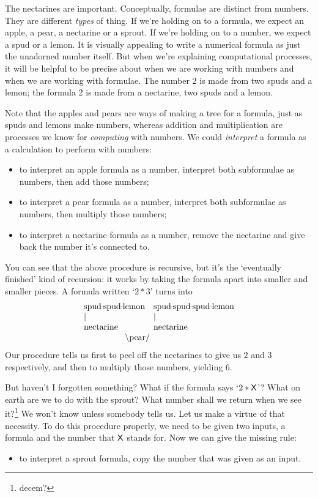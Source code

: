 \documentclass{book}
\begin{document}
The nectarines are important. Conceptually, formulae are distinct from numbers. They are different \emph{types} of thing. If we're holding on to a formula, we expect an apple, a pear, a nectarine or a sprout. If we're holding on to a number, we expect a spud or a lemon. It is visually appealing to write a numerical formula as just the unadorned number itself. But when we're explaining computational processes, it will be helpful to be precise about when we are working with numbers and when we are working with formulae. The number 2 is made from two spuds and a lemon; the formula 2 is made from a nectarine, two spuds and a lemon.

Note that the apples and pears are ways of making a tree for a formula, just as spuds and lemons make numbers, whereas addition and multiplication are processes we know for \emph{computing} with numbers. We could \emph{interpret} a formula as a calculation to perform with numbers:
\begin{itemize}
\item to interpret an apple formula as a number, interpret both subformulae as numbers, then add those numbers;
\item to interpret a pear formula as a number, interpret both subformulae as numbers, then multiply those numbers;
\item to interpret a nectarine formula as a number, remove the nectarine and give back the number it's connected to.
\end{itemize}
You can see that the above procedure is recursive, but it's the `eventually finished' kind of recursion: it works by taking the formula apart into smaller and smaller pieces. A formula written `$2*3$' turns into
\[\begin{array}{l@{\quad}l}
\spud\spud\lemon & \spud\spud\spud\lemon \\
| & | \\
\mbox{nectarine} & \mbox{nectarine} \\
\multicolumn{2}{c}{\backslash\mbox{pear}/\hspace*{0.7in}}
\end{array}\]
Our procedure tells us first to peel off the nectarines to give us $2$ and $3$ respectively, and then to multiply those numbers, yielding 6.

But haven't I forgotten something? What if the formula says `$2*\mathsf{X}$'? What on earth are we to do with the sprout? What number shall we return when we see it?\footnote{decem?} We won't know unless somebody tells us. Let us make a virtue of that necessity. To do this procedure properly, we need to be given two inputs, a formula and the number that $\mathsf{X}$ stands for. Now we can give the missing rule:
\begin{itemize}
\item to interpret a sprout formula, copy the number that was given as an input.
\end{itemize}
\end{document}
